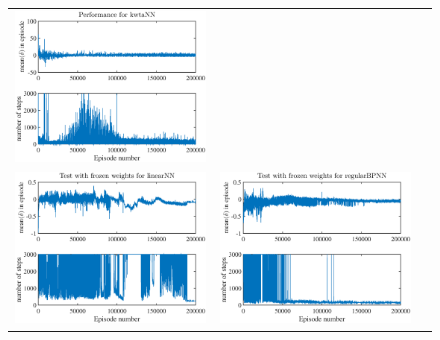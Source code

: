 \documentclass[preprint,12pt,authoryear]{elsarticle}
\begin{document}
\begin{figure}
\begin{center}
\begin{tabular}[h]{ccc}
\includegraphics[scale=0.2]{figures/mountainCar-kwtaNN-performance.eps} \\
\includegraphics[scale=0.2]{figures/mountainCar-linearNN-frozen-test.eps}  &
\includegraphics[scale=0.2]{figures/mountainCar-regularBPNN-frozen-test.eps} &

\end{tabular}
\end{center}
\end{figure}
\end{document}
